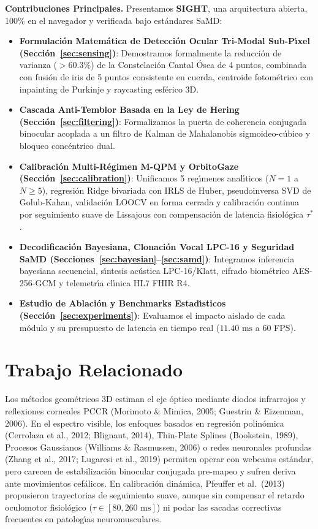 \documentclass[twocolumn,10pt]{article}
\begin{document}
\textbf{Contribuciones Principales.} Presentamos \textbf{SIGHT}, una arquitectura abierta, 100\% en el navegador y verificada bajo est\'andares SaMD:
\begin{itemize}
    \item \textbf{Formulaci\'on Matem\'atica de Detecci\'on Ocular Tri-Modal Sub-P\'{\i}xel (Secci\'on~\ref{sec:sensing})}: Demostramos formalmente la reducci\'on de varianza ($>60.3\%$) de la Constelaci\'on Cantal \'Osea de 4 puntos, combinada con fusi\'on de iris de 5 puntos consistente en cuerda, centroide fotom\'etrico con inpainting de Purkinje y raycasting esf\'erico 3D.
    \item \textbf{Cascada Anti-Temblor Basada en la Ley de Hering (Secci\'on~\ref{sec:filtering})}: Formalizamos la puerta de coherencia conjugada binocular acoplada a un filtro de Kalman de Mahalanobis sigmoideo-c\'ubico y bloqueo conc\'entrico dual.
    \item \textbf{Calibraci\'on Multi-R\'egimen M-QPM y OrbitoGaze (Secci\'on~\ref{sec:calibration})}: Unificamos 5 reg\'{\i}menes anal\'{\i}ticos ($N=1$ a $N \ge 5$), regresi\'on Ridge bivariada con IRLS de Huber, pseudoinversa SVD de Golub-Kahan, validaci\'on LOOCV en forma cerrada y calibraci\'on continua por seguimiento suave de Lissajous con compensaci\'on de latencia fisiol\'ogica $\tau^*$.
    \item \textbf{Decodificaci\'on Bayesiana, Clonaci\'on Vocal LPC-16 y Seguridad SaMD (Secciones~\ref{sec:bayesian}--\ref{sec:samd})}: Integramos inferencia bayesiana secuencial, s\'{\i}ntesis ac\'ustica LPC-16/Klatt, cifrado biom\'etrico AES-256-GCM y telemetr\'{\i}a cl\'{\i}nica HL7 FHIR R4.
    \item \textbf{Estudio de Ablaci\'on y Benchmarks Estad\'{\i}sticos (Secci\'on~\ref{sec:experiments})}: Evaluamos el impacto aislado de cada m\'odulo y su presupuesto de latencia en tiempo real ($11.40\text{ ms}$ a 60 FPS).
\end{itemize}

\section{Trabajo Relacionado}
Los m\'etodos geom\'etricos 3D estiman el eje \'optico mediante diodos infrarrojos y reflexiones corneales PCCR (Morimoto \& Mimica, 2005; Guestrin \& Eizenman, 2006). En el espectro visible, los enfoques basados en regresi\'on polin\'omica (Cerrolaza et al., 2012; Blignaut, 2014), Thin-Plate Splines (Bookstein, 1989), Procesos Gaussianos (Williams \& Rasmussen, 2006) o redes neuronales profundas (Zhang et al., 2017; Lugaresi et al., 2019) permiten operar con webcams est\'andar, pero carecen de estabilizaci\'on binocular conjugada pre-mapeo y sufren deriva ante movimientos cef\'alicos. En calibraci\'on din\'amica, Pfeuffer et al.\ (2013) propusieron trayectorias de seguimiento suave, aunque sin compensar el retardo oculomotor fisiol\'ogico ($\tau \in [80, 260\text{ ms}]$) ni podar las sacadas correctivas frecuentes en patolog\'{\i}as neuromusculares.
\end{document}
